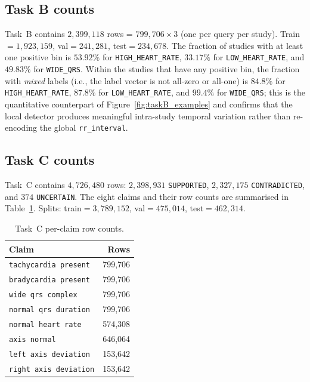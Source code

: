 \documentclass[12pt,letterpaper]{article}
\begin{document}
\subsection*{Task B counts}

Task~B contains $2{,}399{,}118$ rows = $799{,}706\times 3$ (one per query per study). Train$=1{,}923{,}159$, val$=241{,}281$, test$=234{,}678$. The fraction of studies with at least one positive bin is $53.92\%$ for \texttt{HIGH\_HEART\_RATE}, $33.17\%$ for \texttt{LOW\_HEART\_RATE}, and $49.83\%$ for \texttt{WIDE\_QRS}. Within the studies that have any positive bin, the fraction with \emph{mixed} labels (i.e., the label vector is not all-zero or all-one) is $84.8\%$ for \texttt{HIGH\_HEART\_RATE}, $87.8\%$ for \texttt{LOW\_HEART\_RATE}, and $99.4\%$ for \texttt{WIDE\_QRS}; this is the quantitative counterpart of Figure~\ref{fig:taskB_examples} and confirms that the local detector produces meaningful intra-study temporal variation rather than re-encoding the global \texttt{rr\_interval}.

\subsection*{Task C counts}

Task~C contains $4{,}726{,}480$ rows: $2{,}398{,}931$ \texttt{SUPPORTED}, $2{,}327{,}175$ \texttt{CONTRADICTED}, and $374$ \texttt{UNCERTAIN}. The eight claims and their row counts are summarised in Table~\ref{tab:taskC_claim_counts}. Splits: train$=3{,}789{,}152$, val$=475{,}014$, test$=462{,}314$.

\begin{table}[!ht]
\centering
\caption{Task~C per-claim row counts.}
\label{tab:taskC_claim_counts}
\renewcommand{\arraystretch}{1.2}
\begin{tabular}{l r}
\toprule
Claim & Rows \\
\midrule
\texttt{tachycardia present}    & 799{,}706 \\
\texttt{bradycardia present}    & 799{,}706 \\
\texttt{wide qrs complex}       & 799{,}706 \\
\texttt{normal qrs duration}    & 799{,}706 \\
\texttt{normal heart rate}      & 574{,}308 \\
\texttt{axis normal}            & 646{,}064 \\
\texttt{left axis deviation}    & 153{,}642 \\
\texttt{right axis deviation}   & 153{,}642 \\
\bottomrule
\end{tabular}
\end{table}
\end{document}
